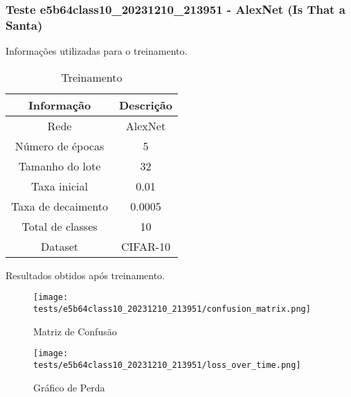\subsubsection{Teste e5b64class10_20231210_213951 - AlexNet (Is That a Santa)}

Informações utilizadas para o treinamento.

\begin{table}[ht]
   \centering
   \caption{Treinamento}
   \label{tab:modelos}
   \begin{tabular}{| c | c | }
      \hline 
      \textbf{Informação} & \textbf{Descrição} \\
      \hline \hline 
      Rede & AlexNet \\
      \hline
      Número de épocas & 5\\
      \hline
      Tamanho do lote & 32\\
      \hline
      Taxa inicial & 0.01 \\
      \hline
      Taxa de decaimento & 0.0005 \\
      \hline
      Total de classes & 10\\
      \hline
      Dataset & CIFAR-10\\
      \hline
   \end{tabular} 
\end{table}

Resultados obtidos após treinamento.


\begin{figure}[ht]
 \begin{center}
   \texttt{[image: tests/e5b64class10\_20231210\_213951/confusion\_matrix.png]}
  \caption{Matriz de Confusão}
  \label{fig:fig03}
 \end{center}
\end{figure}

\begin{figure}[ht]
 \begin{center}
   \texttt{[image: tests/e5b64class10\_20231210\_213951/loss\_over\_time.png]}
  \caption{Gráfico de Perda}
  \label{fig:fig04}
 \end{center}
\end{figure}
